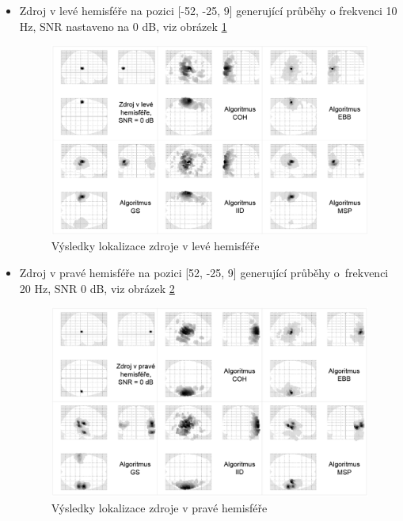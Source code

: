 \begin{itemize}
\item Zdroj v levé hemisféře na pozici [-52, -25, 9] generující průběhy o frekvenci 10 Hz, SNR nastaveno na 0 dB, viz obrázek \ref{scenar1}
\begin{figure}[!h]
\includegraphics[width=1.0\textwidth]{casti/aplikace/porovnani/scenar1.png}
\caption{Výsledky lokalizace zdroje v levé hemisféře}
\label{scenar1}
\end{figure}

\item Zdroj v pravé hemisféře na pozici [52, -25, 9] generující průběhy o~frekvenci 20 Hz, SNR 0 dB, viz obrázek \ref{scenar2}
\begin{figure}[!h]
\includegraphics[width=1.0\textwidth]{casti/aplikace/porovnani/scenar2.png}
\caption{Výsledky lokalizace zdroje v pravé hemisféře}
\label{scenar2}
\end{figure}


\end{itemize}

